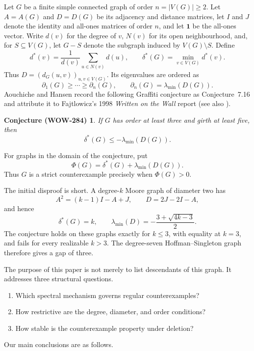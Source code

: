 \documentclass[a4paper,10pt,reqno]{amsart}
\theoremstyle{plain}
\newtheorem*{wowconjecture}{Conjecture (WOW-284)}
\theoremstyle{definition}
\theoremstyle{remark}
\newcommand{\one}{\mathbf 1}
\begin{document}
Let \(G\) be a finite simple connected graph of order
\(n=|V(G)|\ge2\).  Let \(A=A(G)\) and \(D=D(G)\) be its adjacency and
distance matrices, let \(I\) and \(J\) denote the identity and all-ones
matrices of order \(n\), and let \(\one\) be the all-ones vector.  Write
\(d(v)\) for the degree of \(v\), \(N(v)\) for its open neighbourhood, and, for
\(S\subseteq V(G)\), let \(G-S\) denote the subgraph induced by
\(V(G)\setminus S\).  Define
\[
 d^*(v)=\frac1{d(v)}\sum_{u\in N(v)}d(u),
 \qquad
 \delta^*(G)=\min_{v\in V(G)}d^*(v).
\]
Thus \(D=(d_G(u,v))_{u,v\in V(G)}\).  Its eigenvalues are
ordered as
\[
 \partial_1(G)\ge\cdots\ge\partial_n(G),
 \qquad \partial_n(G)=\lambda_{\min}(D(G)).
\]
Aouchiche and Hansen record the following Graffiti conjecture as
Conjecture~7.16 and attribute it to Fajtlowicz's 1998
\emph{Written on the Wall} report
\cite{Fajtlowicz1998} (see also \cite[Conjecture~7.16]{AouchicheHansen2014}).

\begin{wowconjecture}
If \(G\) has order at least three and girth at least five, then
\[
 \delta^*(G)\le-\lambda_{\min}(D(G)).
\]
\end{wowconjecture}

For graphs in the domain of the conjecture, put
\[
 \Phi(G)=\delta^*(G)+\lambda_{\min}(D(G)).
\]
Thus \(G\) is a strict counterexample precisely when \(\Phi(G)>0\).

The initial disproof is short.  A degree-\(k\) Moore graph of diameter two has
\[
 A^2=(k-1)I-A+J,
 \qquad
 D=2J-2I-A,
\]
and hence
\[
 \delta^*(G)=k,
 \qquad
 \lambda_{\min}(D)=-\frac{3+\sqrt{4k-3}}2.
\]
The conjecture holds on these graphs exactly for \(k\le3\), with equality at
\(k=3\), and fails for every realizable \(k>3\).  The degree-seven
Hoffman--Singleton graph therefore gives a gap of three.

The purpose of this paper is not merely to list descendants of this graph.  It
addresses three structural questions.

\begin{enumerate}
\item Which spectral mechanism governs regular counterexamples?
\item How restrictive are the degree, diameter, and order conditions?
\item How stable is the counterexample property under deletion?
\end{enumerate}

Our main conclusions are as follows.
\end{document}
